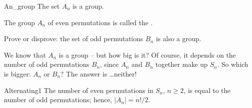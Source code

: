 \begin{prop}{An_group}
The set $A_n$ is a group. 
\end{prop}


\begin{defn} \label{Alternating_Group}
The group $A_n$\label{alternatinggroup} of even permutations is called the . 
\end{defn}

\begin{exercise}{}
Prove or disprove: the set of odd permutations $B_n$ is also a group.
\end{exercise}

% 
% 
% 
 
We know that $A_n$ is a group -- but how big is it? Of course, it depends on the number of odd permutations $B_n$, since $A_n$ and $B_n$ together make up $S_n$.
So which is bigger: $A_n$ or $B_n$? The answer is \ldots neither!

\begin{prop}{Alternating1}
The number of even permutations in $S_n$, $n \geq 2$, is equal to the
number of odd permutations; hence, $| A_n | = n!/2$.
\end{prop}
 
